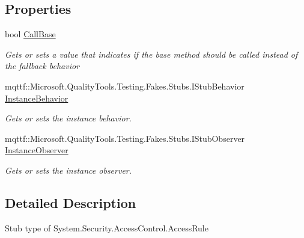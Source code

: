 \subsection*{Properties}
\begin{DoxyCompactItemize}
\item 
bool \hyperlink{class_system_1_1_security_1_1_access_control_1_1_fakes_1_1_stub_access_rule_adee047bb3f37e33df66ea6fba4e688f2}{Call\-Base}
\begin{DoxyCompactList}\small\item\em Gets or sets a value that indicates if the base method should be called instead of the fallback behavior\end{DoxyCompactList}\item 
mqttf\-::\-Microsoft.\-Quality\-Tools.\-Testing.\-Fakes.\-Stubs.\-I\-Stub\-Behavior \hyperlink{class_system_1_1_security_1_1_access_control_1_1_fakes_1_1_stub_access_rule_a91f9991f54fecf5798bc6acfaa999b4f}{Instance\-Behavior}
\begin{DoxyCompactList}\small\item\em Gets or sets the instance behavior.\end{DoxyCompactList}\item 
mqttf\-::\-Microsoft.\-Quality\-Tools.\-Testing.\-Fakes.\-Stubs.\-I\-Stub\-Observer \hyperlink{class_system_1_1_security_1_1_access_control_1_1_fakes_1_1_stub_access_rule_a3c8945177cdf5a980062d02e48d557d4}{Instance\-Observer}
\begin{DoxyCompactList}\small\item\em Gets or sets the instance observer.\end{DoxyCompactList}\end{DoxyCompactItemize}


\subsection{Detailed Description}
Stub type of System.\-Security.\-Access\-Control.\-Access\-Rule



